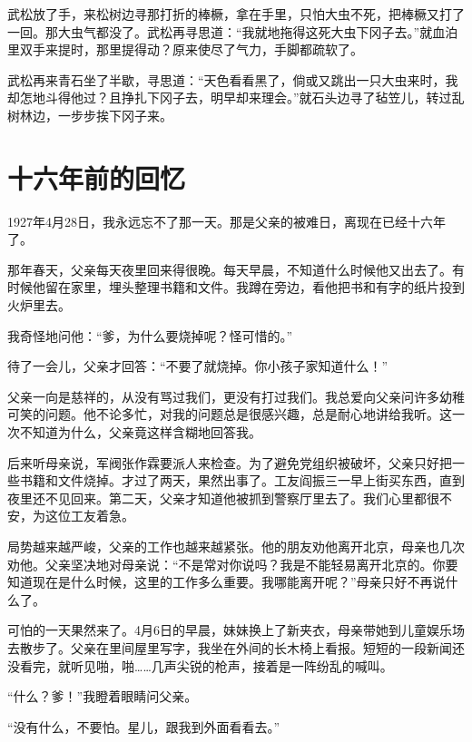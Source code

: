 \documentclass[12pt,UTF-8,openany]{ctexbook}
\begin{document}
\begin{large}
    武松放了手，来松树边寻那打折的棒橛，拿在手里，只怕大虫不死，把棒橛又打了一回。那大虫气都没了。武松再寻思道：“我就地拖得这死大虫下冈子去。”就血泊里双手来提时，那里提得动？原来使尽了气力，手脚都疏软了。
    
    武松再来青石坐了半歇，寻思道：“天色看看黑了，倘或又跳出一只大虫来时，我却怎地斗得他过？且挣扎下冈子去，明早却来理会。”就石头边寻了毡笠儿，转过乱树林边，一步步挨下冈子来。
    
\end{large}



\chapter{十六年前的回忆}

\begin{large}
    
    1927年4月28日，我永远忘不了那一天。那是父亲的被难日，离现在已经十六年了。
    
    那年春天，父亲每天夜里回来得很晚。每天早晨，不知道什么时候他又出去了。有时候他留在家里，埋头整理书籍和文件。我蹲在旁边，看他把书和有字的纸片投到火炉里去。
    
    我奇怪地问他：“爹，为什么要烧掉呢？怪可惜的。”
    
    待了一会儿，父亲才回答：“不要了就烧掉。你小孩子家知道什么！”
    
    父亲一向是慈祥的，从没有骂过我们，更没有打过我们。我总爱向父亲问许多幼稚可笑的问题。他不论多忙，对我的问题总是很感兴趣，总是耐心地讲给我听。这一次不知道为什么，父亲竟这样含糊地回答我。
    
    后来听母亲说，军阀张作霖要派人来检查。为了避免党组织被破坏，父亲只好把一些书籍和文件烧掉。才过了两天，果然出事了。工友阎振三一早上街买东西，直到夜里还不见回来。第二天，父亲才知道他被抓到警察厅里去了。我们心里都很不安，为这位工友着急。
    
    局势越来越严峻，父亲的工作也越来越紧张。他的朋友劝他离开北京，母亲也几次劝他。父亲坚决地对母亲说：“不是常对你说吗？我是不能轻易离开北京的。你要知道现在是什么时候，这里的工作多么重要。我哪能离开呢？”母亲只好不再说什么了。
    
    可怕的一天果然来了。4月6日的早晨，妹妹换上了新夹衣，母亲带她到儿童娱乐场去散步了。父亲在里间屋里写字，我坐在外间的长木椅上看报。短短的一段新闻还没看完，就听见啪，啪……几声尖锐的枪声，接着是一阵纷乱的喊叫。
    
    “什么？爹！”我瞪着眼睛问父亲。
    
    “没有什么，不要怕。星儿，跟我到外面看看去。”
    

\end{large}
\end{document}
